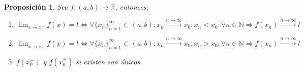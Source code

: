 \documentclass[10pt,a4paper,openright]{book}
\theoremstyle{break}
\newtheorem*{prop}{Proposición}
\begin{document}
\begin{prop}
Sea $f: (a,b)\longrightarrow \mathbb R$, entonces:
\begin{enumerate}
\item $\lim_{x\rightarrow x_0^-}f(x)=l\Leftrightarrow \forall \{x_n\}_{n=1}^\infty \subset (a,b): x_n\xrightarrow{n\rightarrow \infty} x_0: x_n<x_0: \forall n\in \mathbb N\Rightarrow f(x_n)\xrightarrow{n\rightarrow \infty}l$

\item $\lim_{x\rightarrow x_0^+}f(x)=l\Leftrightarrow \forall \{x_n\}_{n=1}^\infty \subset (a,b): x_n\xrightarrow{n\rightarrow \infty} x_0: x_n>x_0: \forall n\in \mathbb N\Rightarrow f(x_n)\xrightarrow{n\rightarrow \infty}l$

\item $f(x_0^-)$ y $f(x_0^+)$ si existen son únicos.
\end{enumerate}
\end{prop}
\end{document}

